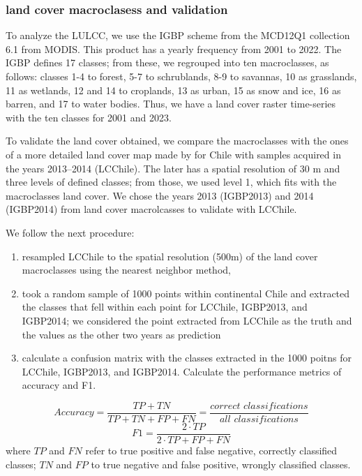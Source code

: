 \documentclass[
  authoryear,
  preprint,
  3p,
  onecolumn]{elsarticle}
\providecommand{\tightlist}{%
  \setlength{\itemsep}{0pt}\setlength{\parskip}{0pt}}\usepackage{longtable,booktabs,array}
\begin{document}
\hypertarget{land-cover-macroclasess-and-validation}{%
\subsubsection{land cover macroclasess and
validation}\label{land-cover-macroclasess-and-validation}}

To analyze the LULCC, we use the IGBP scheme from the MCD12Q1 collection
6.1 from MODIS. This product has a yearly frequency from 2001 to 2022.
The IGBP defines 17 classes; from these, we regrouped into ten
macroclasses, as follows: classes 1-4 to forest, 5-7 to schrublands, 8-9
to savannas, 10 as grasslands, 11 as wetlands, 12 and 14 to croplands,
13 as urban, 15 as snow and ice, 16 as barren, and 17 to water bodies.
Thus, we have a land cover raster time-series with the ten classes for
2001 and 2023.

To validate the land cover obtained, we compare the macroclasses with
the ones of a more detailed land cover map made by \citet{Zhao2016} for
Chile with samples acquired in the years 2013--2014 (LCChile). The later
has a spatial resolution of 30 m and three levels of defined classes;
from those, we used level 1, which fits with the macroclasses land
cover. We chose the years 2013 (IGBP2013) and 2014 (IGBP2014) from land
cover macrolcasses to validate with LCChile.

We follow the next procedure:

\begin{enumerate}
\def\labelenumi{\roman{enumi})}
\tightlist
\item
  resampled LCChile to the spatial resolution (500m) of the land cover
  macroclasses using the nearest neighbor method,
\item
  took a random sample of 1000 points within continental Chile and
  extracted the classes that fell within each point for LCChile,
  IGBP2013, and IGBP2014; we considered the point extracted from LCChile
  as the truth and the values as the other two years as prediction
\item
  calculate a confusion matrix with the classes extracted in the 1000
  poitns for LCChile, IGBP2013, and IGBP2014. Calculate the performance
  metrics of accuracy and F1.
\end{enumerate}

\[Accuracy = \frac{TP+TN}{TP+TN+FP+FN}=\frac{correct\,\, classifications}{all\,\, classifications}\]
\[F1=\frac{2\cdot TP}{2\cdot TP + FP +FN}\] where \(TP\) and \(FN\)
refer to true positive and false negative, correctly classified classes;
\(TN\) and \(FP\) to true negative and false positive, wrongly
classified classes.
\end{document}
